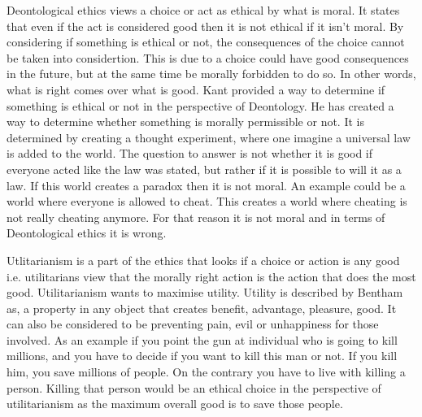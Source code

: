 Deontological ethics views a choice or act as ethical by what is moral. It states that even if the act is considered good then it is not ethical if it isn't moral. By considering if something is ethical or not, the consequences of the choice cannot be taken into considertion. This is due to a choice could have good consequences in the future, but at the same time be morally forbidden to do so. In other words, what is right comes over what is good. 
Kant provided a way to determine if something is ethical or not in the perspective of Deontology. He has created a way to determine whether something is morally permissible or not. It is determined by creating a thought experiment, where one imagine a universal law is added to the world. The question to answer is not whether it is good if everyone acted like the law was stated, but rather if it is possible to will it as a law. If this world creates a paradox then it is not moral. An example could be a world where everyone is allowed to cheat. This creates a world where cheating is not really cheating anymore. For that reason it is not moral and in terms of Deontological ethics it is wrong.

Utlitarianism is a part of the ethics that looks if a choice or action is any good i.e. utilitarians view that the morally right action is the action that does the most good. Utilitarianism wants to maximise utility. Utility is described by Bentham as, a property in any object that creates benefit, advantage, pleasure, good. It can also be considered to be preventing pain, evil or unhappiness for those involved. As an example if you point the gun at individual who is going to kill millions, and you have to decide if you want to kill this man or not. If you kill him, you save millions of people. On the contrary you have to live with killing a person. Killing that person would be an ethical choice in the perspective of utilitarianism as the maximum overall good is to save those people. 

